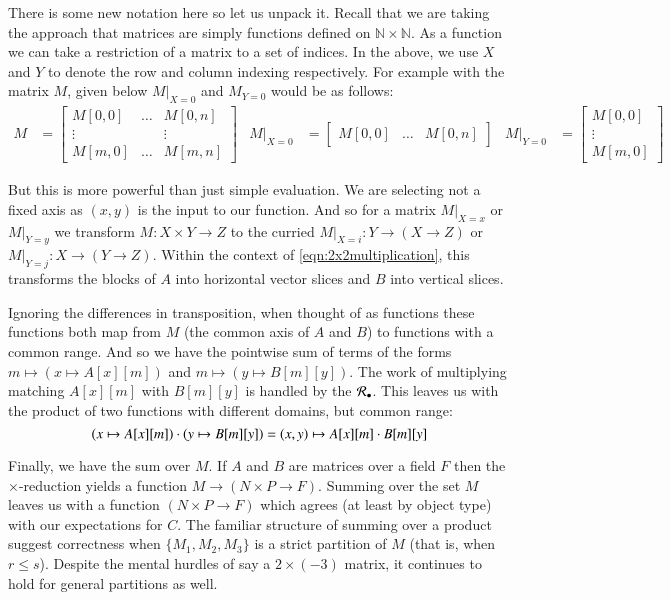 There is some new notation here so let us unpack it.
Recall that we are taking the approach that matrices are simply functions defined on $\mathbb{N} \times \mathbb{N}$.
As a function we can take a restriction of a matrix to a set of indices.
In the above, we use $X$ and $Y$ to denote the row and column indexing respectively.
For example with the matrix $M$, given below $M|_{X=0}$ and $M_{Y=0}$ would be as follows:
\begin{align*}
	M &= \begin{bmatrix}
		M[0,0] 	& \ldots 	& M[0,n] \\
		\vdots 	& 		& \vdots \\
		M[m,0]	& \ldots & M[m,n]
	\end{bmatrix} &
	M|_{X=0} &= \begin{bmatrix}
		M[0,0] & \ldots & M[0,n]
	\end{bmatrix} &
	M|_{Y=0} &= \begin{bmatrix}
		M[0,0] \\ \vdots \\ M[m,0]
	\end{bmatrix}
\end{align*}


But this is more powerful than just simple evaluation.
We are selecting not a fixed axis as $(x,y)$ is the input to our function.
And so for a matrix $M|_{X=x}$ or $M|_{Y=y}$ we transform $M:X\times Y \to Z$
to the curried $M|_{X=i}:Y \to ( X \to Z)$ or $M|_{Y=j}:X \to (Y \to Z)$.
Within the context of \ref{eqn:2x2multiplication}, this transforms the blocks of $A$ into horizontal vector slices 
and $B$ into vertical slices.


Ignoring the differences in transposition, when thought of as functions these functions both map from $M$ 
(the common axis of $A$ and $B$) to functions with a common range.
And so we have the pointwise sum of terms of the forms $m \mapsto ( x \mapsto A[x][m] )$ and 
$m \mapsto (y \mapsto B[m][y])$.
The work of multiplying matching $A[x][m]$ with $B[m][y]$ is handled by the $\R[\smallmult]$.
This leaves us with the product of two functions with different domains, but common range:
\begin{equation*}
	 ( x \mapsto A[x][m] ) \mult (y \mapsto B[m][y]) 
	 = (x,y) \mapsto A[x][m] \mult B[m][y]
\end{equation*}


Finally, we have the sum over $M$.
If $A$ and $B$ are matrices over a field $F$ then the \mbox{$\times$-reduction} 
yields a function $M \to (N \times P \to F)$.
Summing over the set $M$ leaves us with a function $(N \times P \to F)$ which agrees (at least by object type) 
with our expectations for $C$.
The familiar structure of summing over a product suggest correctness when $\big\{ M_1, M_2, M_3 \big\}$ 
is a strict partition of $M$ (that is, when $r \leq s$).
Despite the mental hurdles of say a $2 \times (-3)$ matrix, it continues to hold for general partitions as well.





